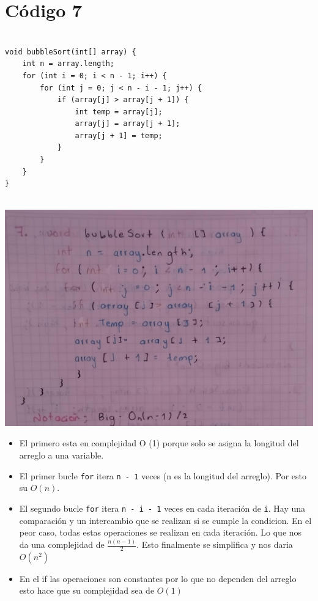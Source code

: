 \documentclass[a4paper,onecolumn,10pt]{article}
\begin{document}
\section{Código 7}

\begin{verbatim}

void bubbleSort(int[] array) {
    int n = array.length;
    for (int i = 0; i < n - 1; i++) {
        for (int j = 0; j < n - i - 1; j++) {
            if (array[j] > array[j + 1]) {
                int temp = array[j];
                array[j] = array[j + 1];
                array[j + 1] = temp;
            }
        }
    }
}
 
\end{verbatim}

\includegraphics[width=1\linewidth]{imagenes/punto 7.jpeg}
\\
\begin{itemize}

    \item El primero esta en complejidad O (1) porque solo se asigna la longitud del arreglo a una variable.
    
    \item El primer bucle \texttt{for} itera \texttt{n - 1} veces (n es la longitud del arreglo). Por esto su $O(n)$.
   
    \item El segundo bucle \texttt{for} itera \texttt{n - i - 1} veces en cada iteración de \texttt{i}. Hay una comparación y un intercambio que se realizan si se cumple la condicion. En el peor caso, todas estas operaciones se realizan en cada iteración. Lo que nos da una complejidad de $\frac{n(n-1)}{2}$. Esto finalmente se simplifica y nos daria $O(n^2)$
   
    \item En el if las operaciones son constantes por lo que no dependen del arreglo esto hace que su complejidad sea de $O(1)$
    
\end{itemize}
\end{document}
